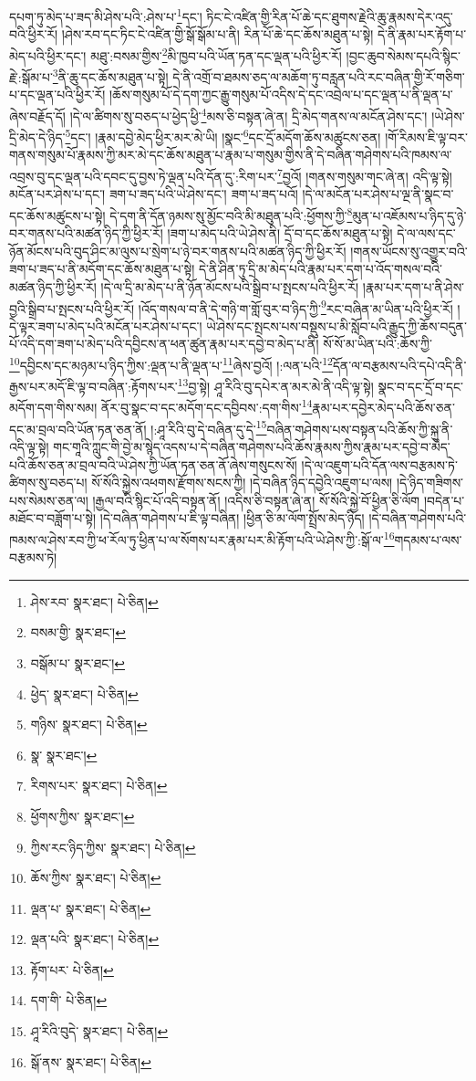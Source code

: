 དཔག་ཏུ་མེད་པ་ཟད་མི་ཤེས་པའི་:ཤེས་པ་\footnote{ཤེས་རབ་  སྣར་ཐང་།  པེ་ཅིན། }དང་། ཏིང་ངེ་འཛིན་གྱི་རིན་པོ་ཆེ་དང་ཐུགས་རྗེའི་ཆུ་རྣམས་དེར་འདུ་བའི་ཕྱིར་རོ། །ཤེས་རབ་དང་ཏིང་ངེ་འཛིན་གྱི་སྒོ་སྒོམ་པ་ནི། རིན་པོ་ཆེ་དང་ཆོས་མཐུན་པ་སྟེ། དེ་ནི་རྣམ་པར་རྟོག་པ་མེད་པའི་ཕྱིར་དང་། མཐུ་:བསམ་གྱིས་\footnote{བསམ་གྱི་  སྣར་ཐང་། }མི་ཁྱབ་པའི་ཡོན་ཏན་དང་ལྡན་པའི་ཕྱིར་རོ། །བྱང་ཆུབ་སེམས་དཔའི་སྙིང་རྗེ་:སྒོམ་པ་\footnote{བསྒོམ་པ་  སྣར་ཐང་། }ནི་ཆུ་དང་ཆོས་མཐུན་པ་སྟེ། དེ་ནི་འགྲོ་བ་ཐམས་ཅད་ལ་མཆོག་ཏུ་བརླན་པའི་རང་བཞིན་གྱི་རོ་གཅིག་པ་དང་ལྡན་པའི་ཕྱིར་རོ། །ཆོས་གསུམ་པོ་དེ་དག་ཀྱང་རྒྱུ་གསུམ་པོ་འདིས་དེ་དང་འབྲེལ་པ་དང་ལྡན་པ་ནི་ལྡན་པ་ཞེས་བརྗོད་དོ། །དེ་ལ་ཚིགས་སུ་བཅད་པ་ཕྱེད་ཕྱི་\footnote{ཕྱེད་  སྣར་ཐང་།  པེ་ཅིན། }མས་ཅི་བསྟན་ཞེ་ན། དྲི་མེད་གནས་ལ་མངོན་ཤེས་དང་། །ཡེ་ཤེས་དྲི་མེད་དེ་ཉིད་\footnote{གཉིས་  སྣར་ཐང་།  པེ་ཅིན། }དང་། །རྣམ་དབྱེ་མེད་ཕྱིར་མར་མེ་ཡི། །སྣང་\footnote{སྣ་  སྣར་ཐང་། }དང་དྲོ་མདོག་ཆོས་མཚུངས་ཅན། །གོ་རིམས་ཇི་ལྟ་བར་གནས་གསུམ་པོ་རྣམས་ཀྱི་མར་མེ་དང་ཆོས་མཐུན་པ་རྣམ་པ་གསུམ་གྱིས་ནི་དེ་བཞིན་གཤེགས་པའི་ཁམས་ལ་འབྲས་བུ་དང་ལྡན་པའི་དབང་དུ་བྱས་ཏེ་ལྡན་པའི་དོན་དུ་:རིག་པར་\footnote{རིགས་པར་  སྣར་ཐང་།  པེ་ཅིན། }བྱའོ། །གནས་གསུམ་གང་ཞེ་ན། འདི་ལྟ་སྟེ། མངོན་པར་ཤེས་པ་དང་། ཟག་པ་ཟད་པའི་ཡེ་ཤེས་དང་། ཟག་པ་ཟད་པའོ། །དེ་ལ་མངོན་པར་ཤེས་པ་ལྔ་ནི་སྣང་བ་དང་ཆོས་མཚུངས་པ་སྟེ། དེ་དག་ནི་དོན་ཉམས་སུ་མྱོང་བའི་མི་མཐུན་པའི་:ཕྱོགས་ཀྱི་\footnote{ཕྱོགས་ཀྱིས་  སྣར་ཐང་། }མུན་པ་འཇོམས་པ་ཉིད་དུ་ཉེ་བར་གནས་པའི་མཚན་ཉིད་ཀྱི་ཕྱིར་རོ། །ཟག་པ་མེད་པའི་ཡེ་ཤེས་ནི། དྲོ་བ་དང་ཆོས་མཐུན་པ་སྟེ། དེ་ལ་ལས་དང་ཉོན་མོངས་པའི་བུད་ཤིང་མ་ལུས་པ་སྲེག་པ་ཉེ་བར་གནས་པའི་མཚན་ཉིད་ཀྱི་ཕྱིར་རོ། །གནས་ཡོངས་སུ་འགྱུར་བའི་ཟག་པ་ཟད་པ་ནི་མདོག་དང་ཆོས་མཐུན་པ་སྟེ། དེ་ནི་ཤིན་ཏུ་དྲི་མ་མེད་པའི་རྣམ་པར་དག་པ་འོད་གསལ་བའི་མཚན་ཉིད་ཀྱི་ཕྱིར་རོ། །དེ་ལ་དྲི་མ་མེད་པ་ནི་ཉོན་མོངས་པའི་སྒྲིབ་པ་སྤངས་པའི་ཕྱིར་རོ། །རྣམ་པར་དག་པ་ནི་ཤེས་བྱའི་སྒྲིབ་པ་སྤངས་པའི་ཕྱིར་རོ། །འོད་གསལ་བ་ནི་དེ་གཉི་ག་གློ་བུར་བ་ཉིད་ཀྱི་\footnote{ཀྱིས་རང་ཉིད་ཀྱིས་  སྣར་ཐང་།  པེ་ཅིན། }རང་བཞིན་མ་ཡིན་པའི་ཕྱིར་རོ། །དེ་ལྟར་ཟག་པ་མེད་པའི་མངོན་པར་ཤེས་པ་དང་། ཡེ་ཤེས་དང་སྤངས་པས་བསྡུས་པ་མི་སློབ་པའི་རྒྱུད་ཀྱི་ཆོས་བདུན་པོ་འདི་དག་ཟག་པ་མེད་པའི་དབྱིངས་ན་ཕན་ཚུན་རྣམ་པར་དབྱེ་བ་མེད་པ་ནི། སོ་སོ་མ་ཡིན་པའི་:ཆོས་ཀྱི་\footnote{ཆོས་ཀྱིས་  སྣར་ཐང་།  པེ་ཅིན། }དབྱིངས་དང་མཉམ་པ་ཉིད་ཀྱིས་:ལྡན་པ་ནི་ལྡན་པ་\footnote{ལྡན་པ་  སྣར་ཐང་།  པེ་ཅིན། }ཞེས་བྱའོ། །:ལན་པའི་\footnote{ལྡན་པའི་  སྣར་ཐང་།  པེ་ཅིན། }དོན་ལ་བརྩམས་པའི་དཔེ་འདི་ནི་རྒྱས་པར་མདོ་ཇི་ལྟ་བ་བཞིན་:རྟོགས་པར་\footnote{རྟོག་པར་  པེ་ཅིན། }བྱ་སྟེ། ཤཱ་རིའི་བུ་དཔེར་ན་མར་མེ་ནི་འདི་ལྟ་སྟེ། སྣང་བ་དང་དྲོ་བ་དང་མདོག་དག་གིས་སམ། ནོར་བུ་སྣང་བ་དང་མདོག་དང་དབྱིབས་:དག་གིས་\footnote{དག་གི་  པེ་ཅིན། }རྣམ་པར་དབྱེར་མེད་པའི་ཆོས་ཅན་དང་མ་བྲལ་བའི་ཡོན་ཏན་ཅན་ནོ། །:ཤཱ་རིའི་བུ་དེ་བཞིན་དུ་དེ་\footnote{ཤཱ་རིའི་བུདེ་  སྣར་ཐང་།  པེ་ཅིན། }བཞིན་གཤེགས་པས་བསྟན་པའི་ཆོས་ཀྱི་སྐུ་ནི་འདི་ལྟ་སྟེ། གང་གཱའི་ཀླུང་གི་བྱེ་མ་སྙེད་འདས་པ་དེ་བཞིན་གཤེགས་པའི་ཆོས་རྣམས་ཀྱིས་རྣམ་པར་དབྱེ་བ་མེད་པའི་ཆོས་ཅན་མ་བྲལ་བའི་ཡེ་ཤེས་ཀྱི་ཡོན་ཏན་ཅན་ནོ་ཞེས་གསུངས་སོ། །དེ་ལ་འཇུག་པའི་དོན་ལས་བརྩམས་ཏེ་ཚིགས་སུ་བཅད་པ། སོ་སོའི་སྐྱེས་འཕགས་རྫོགས་སངས་ཀྱི། །དེ་བཞིན་ཉིད་དབྱེའི་འཇུག་པ་ལས། །དེ་ཉིད་གཟིགས་པས་སེམས་ཅན་ལ། །རྒྱལ་བའི་སྙིང་པོ་འདི་བསྟན་ནོ། །འདིས་ཅི་བསྟན་ཞེ་ན། སོ་སོའི་སྐྱེ་བོ་ཕྱིན་ཅི་ལོག །བདེན་པ་མཐོང་བ་བཟློག་པ་སྟེ། །དེ་བཞིན་གཤེགས་པ་ཇི་ལྟ་བཞིན། །ཕྱིན་ཅི་མ་ལོག་སྤྲོས་མེད་ཉིད། །དེ་བཞིན་གཤེགས་པའི་ཁམས་ལ་ཤེས་རབ་ཀྱི་ཕ་རོལ་ཏུ་ཕྱིན་པ་ལ་སོགས་པར་རྣམ་པར་མི་རྟོག་པའི་ཡེ་ཤེས་ཀྱི་:སྒོ་ལ་\footnote{སྒོ་ནས་  སྣར་ཐང་།  པེ་ཅིན། }གདམས་པ་ལས་བརྩམས་ཏེ། 